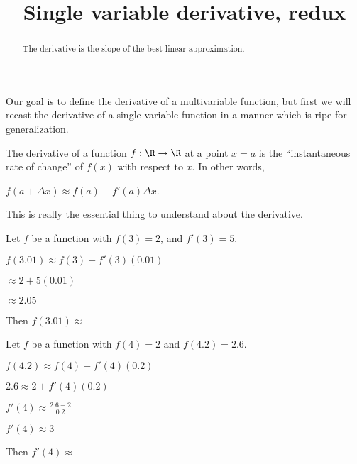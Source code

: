 \documentclass{ximera}
\title{Single variable derivative, redux}
\begin{document}
\begin{abstract}
The derivative is the slope of the best linear approximation.
\end{abstract}
	
Our goal is to define the derivative of a multivariable function, but first we will recast the derivative of a single variable function in a
manner which is ripe for generalization.
	
The derivative of a function $f:\R \to \R$ at a point $x = a$ is the ``instantaneous rate of change'' of $f(x)$ with respect to $x$.
In other words, 
	
$f(a + \Delta x) \approx f(a) +f'(a)\Delta x$.
	
This is really the essential thing to understand about the derivative.
	
\begin{question}
  Let $f$ be a function with $f(3)  = 2$, and $f'(3) = 5$.
  \begin{solution}
    \begin{hint}
      $f(3.01) \approx f(3)+f'(3)(0.01)$
    \end{hint}
    \begin{hint}
      $\approx 2+5(0.01)$
    \end{hint}
    \begin{hint}
      $\approx 2.05$
    \end{hint}
    Then $f(3.01) \approx $ 
  \end{solution}
\end{question}
	
\begin{question}
  Let $f$ be a function with $f(4)=2$ and $f(4.2) = 2.6$.  
  
  \begin{solution}
    \begin{hint}
      $f(4.2) \approx f(4)+f'(4)(0.2)$
    \end{hint}
    \begin{hint}
      $2.6 \approx 2+f'(4)(0.2)$
    \end{hint}
    \begin{hint}
      $f'(4) \approx \frac{2.6 - 2}{0.2}$
    \end{hint}
    \begin{hint}
      $f'(4) \approx 3$
    \end{hint}
    Then $f'(4) \approx$ 
  \end{solution}
\end{question}
\end{document}
